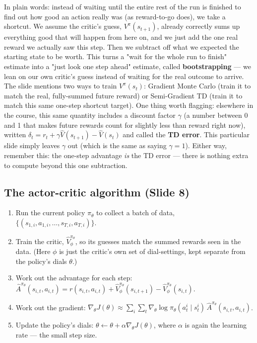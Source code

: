 \documentclass[11pt]{article}
\begin{document}
In plain words: instead of waiting until the entire rest of the run is finished to find out how good an action really was (as reward-to-go does), we take a shortcut. We assume the critic's guess, $V^\pi(s_{t+1})$, already correctly sums up everything good that will happen from here on, and we just add the one real reward we actually saw this step. Then we subtract off what we expected the starting state to be worth. This turns a "wait for the whole run to finish" estimate into a "just look one step ahead" estimate, called \textbf{bootstrapping} --- we lean on our own critic's guess instead of waiting for the real outcome to arrive. The slide mentions two ways to train $V^\pi(s_t)$: Gradient Monte Carlo (train it to match the real, fully-summed future reward) or Semi-Gradient TD (train it to match this same one-step shortcut target). One thing worth flagging: elsewhere in the course, this same quantity includes a discount factor $\gamma$ (a number between 0 and 1 that makes future rewards count for slightly less than reward right now), written $\delta_t = r_t + \gamma \hat V(s_{t+1}) - \hat V(s_t)$ and called the \textbf{TD error}. This particular slide simply leaves $\gamma$ out (which is the same as saying $\gamma=1$). Either way, remember this: the one-step advantage \emph{is} the TD error --- there is nothing extra to compute beyond this one subtraction.

\subsection{The actor-critic algorithm (Slide 8)}
\begin{enumerate}[leftmargin=*]
  \item Run the current policy $\pi_\theta$ to collect a batch of data, $\{(s_{1,i},a_{1,i},\dots,s_{T,i},a_{T,i})\}$.
  \item Train the critic, $\hat V^{\pi_\theta}_\phi$, so its guesses match the summed rewards seen in the data. (Here $\phi$ is just the critic's own set of dial-settings, kept separate from the policy's dials $\theta$.)
  \item Work out the advantage for each step: $\hat A^{\pi_\theta}(s_{i,t},a_{i,t}) = r(s_{i,t},a_{i,t}) + \hat V^{\pi_\theta}_\phi(s_{i,t+1}) - \hat V^{\pi_\theta}_\phi(s_{i,t})$.
  \item Work out the gradient: $\nabla_\theta J(\theta) \approx \sum_i\sum_t \nabla_\theta\log\pi_\theta(a^i_t\mid s^i_t)\,\hat A^{\pi_\theta}(s_{i,t},a_{i,t})$.
  \item Update the policy's dials: $\theta \leftarrow \theta + \alpha \nabla_\theta J(\theta)$, where $\alpha$ is again the learning rate --- the small step size.
\end{enumerate}
\end{document}
